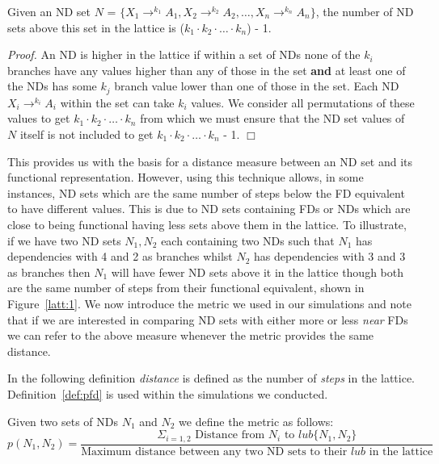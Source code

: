 \begin{proposition}
\begin{rm}
Given an ND set $N$ = \linebreak[4]   $\{ X_1 \to^{k_1} A_1, X_2 \to^{k_2} A_2,
 \ldots, X_n \to^{k_n} A_n \}$, the number of ND sets above this set in the
lattice is ($k_1 \cdot k_2 \cdot \ldots \cdot k_n$) - 1.
\end{rm}
\end{proposition}

{\em Proof.} An ND is higher in the lattice if within a 
set of NDs none of the $k_i$ branches have any values higher than
any of those in the set {\bf and} at least one of the NDs has some 
$k_j$ branch value
lower than one of those in the set. Each ND $X_i \to^{k_i} A_i$ within
the set can take $k_i$ values. We consider all permutations of these
values to get $k_1 \cdot k_2 \cdot \ldots \cdot k_n$ from which we 
must ensure that the ND set values of $N$ itself is not included to get
$k_1 \cdot k_2 \cdot \ldots \cdot k_n$ - 1. $\Box$

\smallskip

This provides us with the basis for a distance measure between an ND set
and its functional representation. However,  using this technique allows,
in some instances, ND sets which are the same number of steps below the
FD equivalent to have different values. This is due to ND sets containing
FDs or NDs which are close to being functional having less sets above them
in the lattice. To illustrate, if we have two ND sets $N_1,N_2$ each containing two NDs such that $N_1$ has dependencies with 4 and 2 as branches whilst $N_2$ has dependencies with 3 and 3 as branches then $N_1$ will have fewer ND sets
above it in the lattice though both are the same number of steps from their
functional equivalent, shown in Figure~\ref{latt:1}. We now introduce the 
metric we used in our simulations
and note that if we are interested in comparing ND sets with either more 
or less {\em near} FDs we can refer to the above measure 
whenever the metric provides the same distance.
\smallskip

In the following definition {\em distance} is defined as the number of
{\em steps} in the lattice. Definition~\ref{def:pfd} is used within
the simulations we conducted.

\begin{definition}
\begin{rm}
Given two sets of NDs $N_1$ and $N_2$ we define the metric as follows: 
\[
p(N_1,N_2) = \frac{\Sigma_{i = 1, 2} \mbox{ Distance from } N_i \mbox{ to }  lub \{ N_1, N_2 \}}
{\mbox{Maximum distance between any two ND sets to their $lub$ in the lattice}}
\]
\end{rm}
\end{definition}

